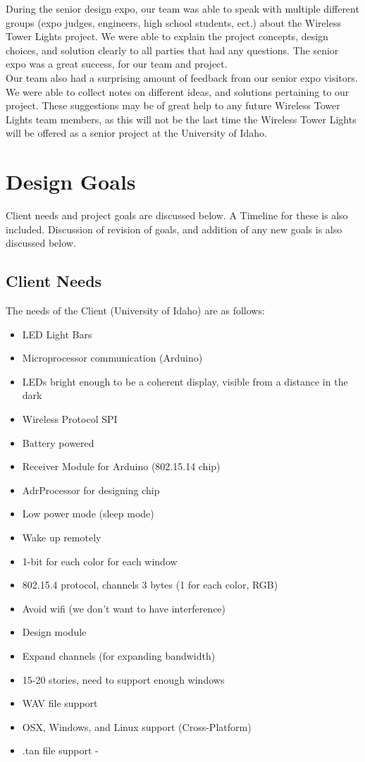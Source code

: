 \documentclass[12pt]{article}
\begin{document}
{{	\noindent
	During the senior design expo, our team was able to speak with multiple different 	groups (expo judges, engineers, high school students, ect.) about the Wireless 			Tower Lights project. We were able to explain the project concepts, design 				choices, and solution clearly to all parties that had any questions. The senior 		expo was a great success, for our team and project.\\ 
	  
	\noindent
	Our team also had a surprising amount of feedback from our senior expo visitors. 		We were able to collect notes on different ideas, and solutions pertaining to our 	project. These suggestions may be of great help to any future Wireless Tower 			Lights team members, as this will not be the last time the Wireless Tower Lights 		will be offered as a senior project at the University of Idaho. 	
	
	\clearpage
	
\section{Design Goals}
	Client needs and project goals are discussed below. A Timeline for these is also included. Discussion of revision of goals, and addition of any new goals is also discussed below.
	
	\subsection{Client Needs}
	The needs of the Client (University of Idaho) are as follows:
		
		\begin{itemize}
			\item LED Light Bars
			\item Microprocessor communication (Arduino)
			\item LEDs bright enough to be a coherent display, visible from a distance in the dark
			\item Wireless Protocol SPI
			\item Battery powered
			\item Receiver Module for Arduino (802.15.14 chip) 
			\item AdrProcessor for designing chip
			\item Low power mode (sleep mode)
			\item Wake up remotely
			\item 1-bit for each color for each window
			\item 802.15.4 protocol, channels 3 bytes (1 for each color, RGB)
			\item Avoid wifi (we don't want to have interference)
			\item Design module
			\item Expand channels (for expanding bandwidth)
			\item 15-20 stories, need to support enough windows
			\item WAV file support
			\item OSX, Windows, and Linux support (Cross-Platform)
			\item .tan file support - 
		\end{itemize}
	
}}
\end{document}
